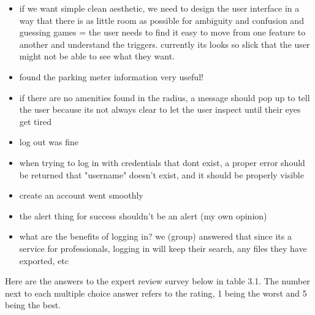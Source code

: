 \documentclass{report}
\begin{document}
\begin{itemize}
    \item if we want simple clean aesthetic, we need to design the user interface in a way that there is as little room as possible for ambiguity and confusion and guessing games = the user needs to find it easy to move from one feature to another and understand the triggers. currently its looks so slick that the user might not be able to see what they want.
    \item found the parking meter information very useful!
    \item if there are no amenities found in the radius, a message should pop up to tell the user because its not always clear to let the user inspect until their eyes get tired
    \item log out was fine
    \item when trying to log in with credentials that dont exist, a proper error should be returned that "username" doesn't exist, and it should be properly visible
    \item create an account went smoothly
    \item the alert thing for success shouldn't be an alert (my own opinion)
    \item what are the benefits of logging in? we (group) answered that since its a service for professionals, logging in will keep their search, any files they have exported, etc
\end{itemize}
Here are the answers to the expert review survey below in table 3.1. The number next to each multiple choice answer refers to the rating, 1 being the worst and 5 being the best.
\end{document}
